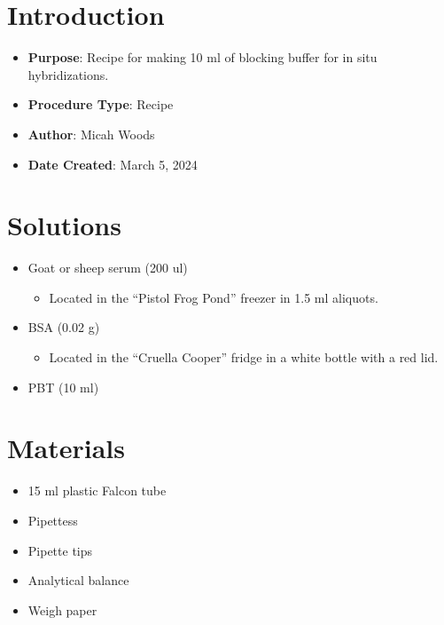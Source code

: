 \documentclass[
  letterpaper,
  DIV=11,
  numbers=noendperiod]{scrreprt}
\providecommand{\tightlist}{%
  \setlength{\itemsep}{0pt}\setlength{\parskip}{0pt}}\usepackage{longtable,booktabs,array}
\begin{document}
\hypertarget{introduction-99}{%
\section{Introduction}\label{introduction-99}}

\begin{itemize}
\tightlist
\item
  \textbf{Purpose}: Recipe for making 10 ml of blocking buffer for in
  situ hybridizations.
\item
  \textbf{Procedure Type}: Recipe
\item
  \textbf{Author}: Micah Woods
\item
  \textbf{Date Created}: March 5, 2024
\end{itemize}

\hypertarget{solutions-85}{%
\section{Solutions}\label{solutions-85}}

\begin{itemize}
\tightlist
\item
  Goat or sheep serum (200 ul)

  \begin{itemize}
  \tightlist
  \item
    Located in the ``Pistol Frog Pond'' freezer in 1.5 ml aliquots.
  \end{itemize}
\item
  BSA (0.02 g)

  \begin{itemize}
  \tightlist
  \item
    Located in the ``Cruella Cooper'' fridge in a white bottle with a
    red lid.
  \end{itemize}
\item
  PBT (10 ml)
\end{itemize}

\hypertarget{materials-94}{%
\section{Materials}\label{materials-94}}

\begin{itemize}
\tightlist
\item
  15 ml plastic Falcon tube
\item
  Pipettess
\item
  Pipette tips
\item
  Analytical balance
\item
  Weigh paper
\end{itemize}
\end{document}
